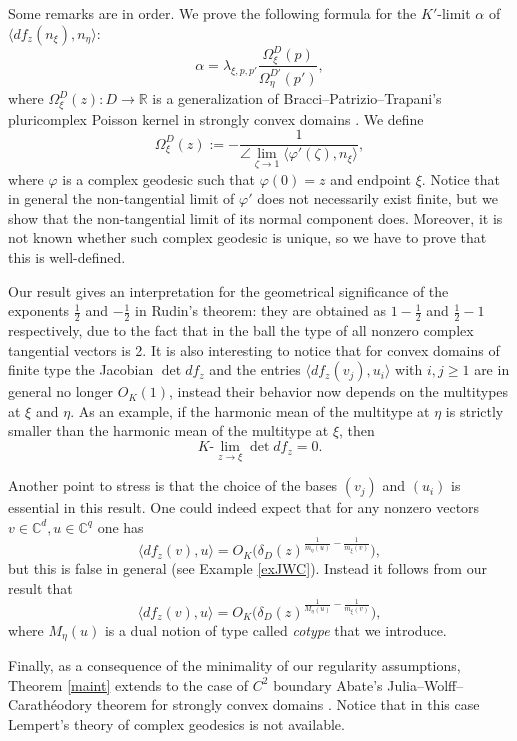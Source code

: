 \documentclass[11pt, reqno]{amsart}
\numberwithin{equation}{section}
\theoremstyle{definition}
\newcommand{\C}{\mathbb{C}}
\newcommand{\R}{\mathbb{R}}
\begin{document}
	Some remarks are in order.
	We prove the following formula for the $K'$-limit $\alpha$ of $\langle df_z(n_\xi),n_\eta\rangle$:
	$$\alpha=\lambda_{\xi,p,p'}\frac{\Omega^D_\xi(p)}{\Omega^{D'}_\eta(p')},$$ where   $\Omega^D_\xi(z)\colon D\to \R$ is
	a generalization of Bracci--Patrizio--Trapani's pluricomplex Poisson kernel in strongly convex domains \cite{BP,BPT}. We define
	$$\Omega^D_\xi(z):=-\frac{1}{\angle\lim_{\zeta\to 1}\langle \varphi'(\zeta),n_\xi\rangle},$$ where $\varphi$ is a complex geodesic such that $\varphi(0)=z$ and endpoint $\xi$.
	Notice that in general the non-tangential limit of $\varphi'$ does not necessarily exist finite, but we show that the
	non-tangential limit of its normal component does.  Moreover, it is not known whether such complex geodesic is unique, so we have to prove that this is well-defined.
	
	Our result gives an interpretation for the geometrical significance of the exponents $\frac{1}{2}$ and $-\frac{1}{2}$ in Rudin's theorem: they are obtained as $1-\frac{1}{2}$ and $\frac{1}{2}-1$ respectively, due to the fact that in the ball the type of all nonzero complex tangential vectors is 2. It is also interesting to notice that for convex domains of finite type the Jacobian $\det df_z$ and the entries  $\langle df_z(v_j),u_i \rangle$ with $i,j\geq 1$ are in general no longer $O_K(1)$, instead their behavior now depends on the multitypes at $\xi$ and $\eta$. As an example,  if the harmonic mean of the multitype at $\eta$ is strictly smaller than the harmonic mean of the multitype at $\xi$, then 
	$$K\textrm{-}\lim_{z\to \xi} \det df_z=0.$$ 
	
	
	
	Another point to stress is that the choice of the bases  $(v_j)$ and $(u_i)$   is essential in this result. One could indeed expect that for any nonzero vectors $v\in \C^d,u\in \C^q$ one has
	$$\langle df_z(v),u \rangle=O_K\biggl(\delta_D(z)^{\frac{1}{m_\eta(u)}-\frac{1}{m_\xi(v)}}\biggr),$$ but this is false in general (see Example \ref{exJWC}). 
	Instead it follows from our result that $$\langle df_z(v),u \rangle=O_K\biggl(\delta_D(z)^{\frac{1}{M_\eta(u)}-\frac{1}{m_\xi(v)}}\biggr),$$
	where $M_\eta(u)$ is a dual notion of type called {\sl cotype} that we introduce.
	
	Finally, as a consequence of the minimality of our regularity  assumptions, Theorem \ref{maint} extends to the case of $C^2$ boundary Abate's Julia--Wolff--Carath\'eodory theorem for strongly convex domains \cite{Abatelindelof}. Notice that in this case  Lempert's theory of complex geodesics is not available.
	
\end{document}
